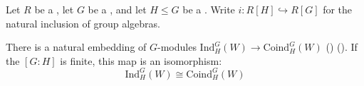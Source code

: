 \begin{proposition} \label{proposition:induction_of_a_group_module_over_a_ring_to_a_supergroup_embeds_into_the_coinduction_and_is_an_isomorphism_if_the_index_is_finite}
    Let $R$ be a , let $G$ be a , and let $H \leq G$ be a . Write $i: R[H] \hookrightarrow R[G]$ for the natural inclusion of group algebras.

    There is a natural embedding of $G$-modules $\text{Ind}^G_H(W) \to \text{Coind}^G_H(W)$ () (). If the  $[G:H]$ is finite, this map is an isomorphism:
    $$\text{Ind}^G_H(W) \cong \text{Coind}^G_H(W)$$
\end{proposition}